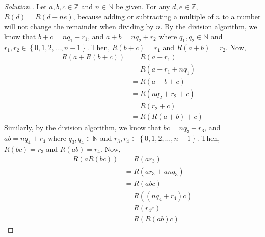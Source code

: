 \documentclass{article}
\newcommand{\N}[0]{\mathbb{N}}
\newcommand{\Z}[0]{\mathbb{Z}}
\newcommand{\set}[1]{\left\{#1\right\}}
\begin{document}
\begin{proof}[Solution.]
Let $a,b,c\in\Z$ and $n\in\N$ be given. For any $d,e\in\Z$, $R(d)=R(d+ne)$, because adding or subtracting a multiple of $n$ to a number will not change the remainder when dividing by $n$. 
By the division algorithm, we know that $b+c=nq_1+r_1$, and $a+b=nq_2+r_2$ where $q_1, q_2\in \N$ and $r_1, r_2\in\set{0,1,2,\dots, n-1}$. Then, $R(b+c)=r_1$ and $R(a+b)=r_2$. Now,
\[
\begin{split}
R(a + R(b + c))&= R(a+ r_1)\\
    &= R(a+r_1+nq_1)\\
    &= R(a+b+c)\\
    &= R(nq_2+r_2 + c)\\
    &= R(r_2 + c)\\
    &= R(R(a+b)+c)
\end{split}
\]
Similarly, by the division algorithm, we know that $bc=nq_3+r_3$, and $ab=nq_4+r_4$ where $q_3, q_4\in \N$ and $r_3, r_4\in\set{0,1,2,\dots, n-1}$. Then, $R(bc)=r_3$ and $R(ab)=r_4$. Now,
\[
\begin{split}
R(a  R(b  c))&= R(a r_3)\\
    &= R(ar_3+anq_3)\\
    &= R(abc)\\
    &= R((nq_4+r_4)c)\\
    &= R(r_4  c)\\
    &= R(R(ab)c)
\end{split}
\]
\end{proof}
\end{document}
